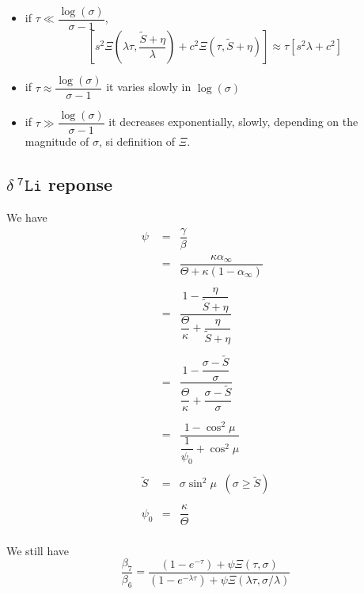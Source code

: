 \documentclass[aps,onecolumn,12pt]{revtex4}
\newcommand{\mychem}[1]{\mathtt{#1}}
\newcommand{\spLi}[1]{{~^{\mychem{#1}}\mychem{Li}}}
\newcommand{\deltaLi}{ {\delta\!\!\!\spLi{7}} }
\begin{document}
\begin{itemize}
\item if $\tau\ll\dfrac{\log(\sigma)}{\sigma-1}$, 
	$$
		\left[  s^2 \Xi\left(\lambda\tau,{\dfrac{\tilde{S}+\eta}{\lambda}}\right) + c^2 \Xi\left(\tau,\tilde{S}+\eta\right) \right]
		\approx \tau \left[ s^2\lambda+c^2\right]
	$$
\item if $\tau\approx\dfrac{\log(\sigma)}{\sigma-1}$
	it varies slowly in $\log(\sigma)$
	
\item if $\tau\gg\dfrac{\log(\sigma)}{\sigma-1}$
	it decreases exponentially, slowly, depending on the magnitude of $\sigma$, si definition of $\Xi$.
\end{itemize}

\subsection{$\deltaLi$ reponse}
We have
\begin{equation}
	\begin{array}{rcl}
	\psi & = & \dfrac{\gamma}{\beta}\\
	&=& \dfrac{\kappa \alpha_\infty}{\Theta+\kappa\left(1-\alpha_\infty\right)}\\
	\\
	&=& \dfrac{1-\dfrac{\eta}{\tilde{S}+\eta}} {\dfrac{\Theta}{\kappa} + \dfrac{\eta}{\tilde{S}+\eta} }\\
	\\
	& = & \dfrac{1-\dfrac{\sigma-\tilde{S}}{\sigma}}{\dfrac{\Theta}{\kappa} + \dfrac{\sigma-\tilde{S}}{\sigma}}\\
	\\
	& = & \dfrac{1-\cos^2\mu}{\dfrac{1}{\psi_0}+\cos^2\mu}\\
	\\
	\tilde{S} & = & \sigma \sin^2\mu \;\; (\sigma\geq\tilde{S})\\
	\\
	\psi_0 & = & \dfrac{\kappa}{\Theta} \\
	\end{array}
\end{equation}

We still have
\begin{equation}
	\dfrac{\beta_7}{\beta_6} = \dfrac
	{\left(1-e^{-\tau}\right)+\psi\Xi\left(\tau,\sigma\right)}
	{\left(1-e^{-\lambda\tau}\right)+\psi\Xi\left(\lambda\tau,\sigma/\lambda\right)}
\end{equation}
\end{document}
